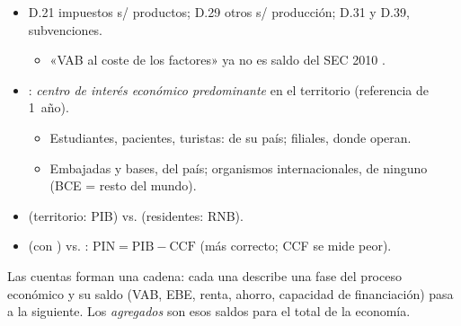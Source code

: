\documentclass{article}
\begin{document}
\begin{columnas}
\begin{itemize}
\item D.21 impuestos s/ productos; D.29 otros s/ producción; D.31 y D.39, subvenciones.
  \begin{itemize}
  \item «VAB al coste de los factores» ya no es saldo del SEC 2010 .
  \end{itemize}
\end{itemize}
\begin{itemize}
\item {}: \emph{centro de interés económico predominante} en el territorio (referencia de 1~año).
  \begin{itemize}
  \item Estudiantes, pacientes, turistas: de su país; filiales, donde operan.
  \item Embajadas y bases, del país; organismos internacionales, de ninguno (BCE = resto del mundo).
  \end{itemize}
\end{itemize}
\begin{itemize}
\item {} (territorio: PIB) vs.  (residentes: RNB).
\item {} (con ) vs. : $\mathrm{PIN}=\mathrm{PIB}-\mathrm{CCF}$ (más correcto; CCF se mide peor).
\end{itemize}

\begin{ideaclave}
Las cuentas forman una cadena: cada una describe una fase del proceso económico y su saldo (VAB, EBE, renta, ahorro, capacidad de financiación) pasa a la siguiente. Los \emph{agregados} son esos saldos para el total de la economía.
\end{ideaclave}


\end{columnas}
\end{document}
